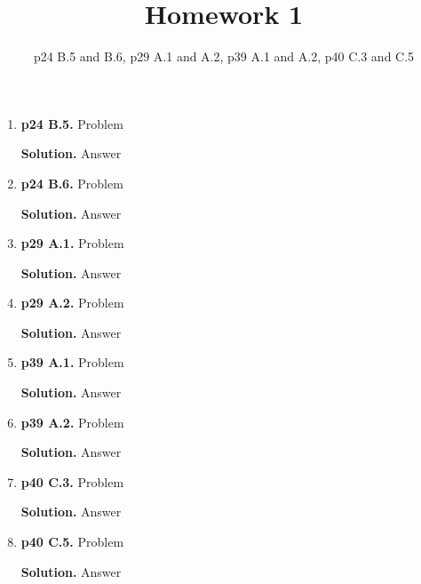 \documentclass[11pt]{article}
\begin{document}
\title{Homework 1}

\date{p24 B.5 and B.6, p29 A.1 and A.2, p39 A.1 and A.2, p40 C.3 and C.5}

\maketitle 

\thispagestyle{fancy}  
\pagestyle{fancy}      

\begin{enumerate}

\item {\bfseries p24 B.5.} 
  Problem
  
  {\bfseries Solution.} 
  Answer
 
\item {\bfseries p24 B.6.} 
  Problem
  
  {\bfseries Solution.} 
  Answer
 
\item {\bfseries p29 A.1.} 
  Problem
  
  {\bfseries Solution.} 
  Answer
 
\item {\bfseries p29 A.2.} 
  Problem
  
  {\bfseries Solution.} 
  Answer
 
\item {\bfseries p39 A.1.} 
  Problem
  
  {\bfseries Solution.} 
  Answer
 
\item {\bfseries p39 A.2.} 
  Problem
  
  {\bfseries Solution.} 
  Answer
 
\item {\bfseries p40 C.3.} 
  Problem
  
  {\bfseries Solution.} 
  Answer
 
\item {\bfseries p40 C.5.} 
  Problem
  
  {\bfseries Solution.} 
  Answer


\end{enumerate}
\end{document}
